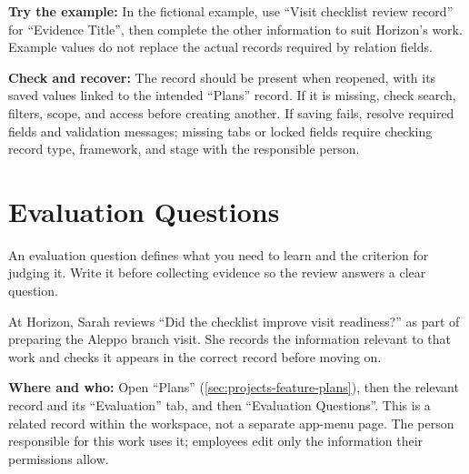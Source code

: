 \textbf{Try the example:} In the fictional example, use “Visit checklist review record” for “Evidence Title”, then complete the other information to suit Horizon's work. Example values do not replace the actual records required by relation fields.

\textbf{Check and recover:} The record should be present when reopened, with its saved values linked to the intended “Plans” record. If it is missing, check search, filters, scope, and access before creating another. If saving fails, resolve required fields and validation messages; missing tabs or locked fields require checking record type, framework, and stage with the responsible person.

\clearpage
\section{Evaluation Questions}
\label{sec:projects-feature-planning-evaluation-questions}

An evaluation question defines what you need to learn and the criterion for judging it. Write it before collecting evidence so the review answers a clear question.

\begin{rcnote}
At Horizon, Sarah reviews “Did the checklist improve visit readiness?” as part of preparing the Aleppo branch visit. She records the information relevant to that work and checks it appears in the correct record before moving on.
\end{rcnote}

\textbf{Where and who:} Open “Plans” (\ref{sec:projects-feature-plans}), then the relevant record and its “Evaluation” tab, and then “Evaluation Questions”. This is a related record within the workspace, not a separate app-menu page. The person responsible for this work uses it; employees edit only the information their permissions allow.


